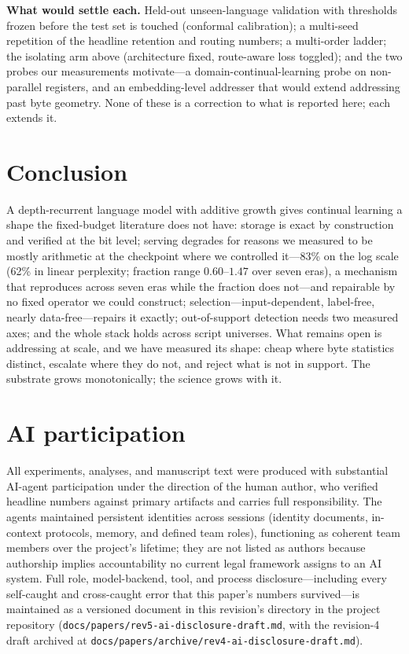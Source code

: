 \documentclass[11pt]{article}
\theoremstyle{definition}\newtheorem{definition}{Definition}
\theoremstyle{remark}\newtheorem{remark}{Remark}
\begin{document}
\textbf{What would settle each.} Held-out unseen-language validation with thresholds
frozen before the test set is touched (conformal calibration); a multi-seed repetition of
the headline retention and routing numbers; a multi-order ladder; the isolating arm above
(architecture fixed, route-aware loss toggled); and the two probes our measurements motivate---a domain-continual-learning probe on non-parallel registers, and
an embedding-level addresser that would extend addressing past byte geometry. None of
these is a correction to what is reported here; each extends it.

\section{Conclusion}
\label{sec:conclusion}

A depth-recurrent language model with additive growth gives continual learning a shape
the fixed-budget literature does not have: storage is exact by construction and verified
at the bit level; serving degrades for reasons we measured to be mostly arithmetic at the checkpoint where we
controlled it---83\% on the log scale (62\% in linear perplexity; fraction range $0.60$--$1.47$ over seven eras), a mechanism that reproduces across seven eras
while the fraction does not---and repairable by no fixed operator we could construct; selection---input-dependent,
label-free, nearly data-free---repairs it exactly; out-of-support detection needs two
measured axes; and the whole stack holds across script universes. What remains open is
addressing at scale, and we have measured its shape: cheap where byte statistics
distinct, escalate where they do not, and reject what is not in support. The substrate
grows monotonically; the science grows with it.

\section*{AI participation}
\label{sec:ai-disclosure}

All experiments, analyses, and manuscript text were produced with substantial
AI-agent participation under the direction of the human author, who verified headline
numbers against primary artifacts and carries full responsibility. The agents maintained
persistent identities across sessions (identity documents, in-context protocols, memory,
and defined team roles), functioning as coherent team members over the project's
lifetime; they are not listed as authors because authorship implies accountability no
current legal framework assigns to an AI system. Full role, model-backend, tool, and
process disclosure---including every self-caught and cross-caught error that this
paper's numbers survived---is maintained as a versioned document in this revision's
directory in the project repository (\texttt{docs/papers/rev5-ai-disclosure-draft.md},
with the revision-4 draft archived at \texttt{docs/papers/archive/rev4-ai-disclosure-draft.md}).
\end{document}
